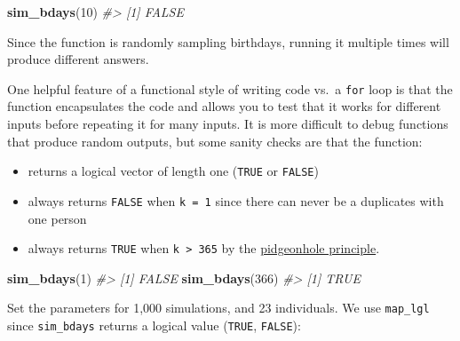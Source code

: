 \documentclass[]{book}
\newenvironment{Shaded}{\begin{snugshade}}{\end{snugshade}}
\newcommand{\CommentTok}[1]{\textcolor[rgb]{0.56,0.35,0.01}{\textit{#1}}}
\newcommand{\DecValTok}[1]{\textcolor[rgb]{0.00,0.00,0.81}{#1}}
\newcommand{\KeywordTok}[1]{\textcolor[rgb]{0.13,0.29,0.53}{\textbf{#1}}}
\newcommand{\NormalTok}[1]{#1}
\newcommand{\OperatorTok}[1]{\textcolor[rgb]{0.81,0.36,0.00}{\textbf{#1}}}
\newcommand{\StringTok}[1]{\textcolor[rgb]{0.31,0.60,0.02}{#1}}
\providecommand{\tightlist}{%
  \setlength{\itemsep}{0pt}\setlength{\parskip}{0pt}}
\theoremstyle{definition}
\theoremstyle{definition}
\theoremstyle{definition}
\theoremstyle{remark}
\begin{document}
\begin{Shaded}
\begin{Highlighting}[]
\KeywordTok{sim_bdays}\NormalTok{(}\DecValTok{10}\NormalTok{)}
\CommentTok{#> [1] FALSE}
\end{Highlighting}
\end{Shaded}

Since the function is randomly sampling birthdays, running it multiple
times will produce different answers.

One helpful feature of a functional style of writing code vs.~a
\texttt{for} loop is that the function encapsulates the code and allows
you to test that it works for different inputs before repeating it for
many inputs. It is more difficult to debug functions that produce random
outputs, but some sanity checks are that the function:

\begin{itemize}
\tightlist
\item
  returns a logical vector of length one (\texttt{TRUE} or
  \texttt{FALSE})
\item
  always returns \texttt{FALSE} when \texttt{k\ =\ 1} since there can
  never be a duplicates with one person
\item
  always returns \texttt{TRUE} when \texttt{k\ \textgreater{}\ 365} by
  the
  \href{https://en.wikipedia.org/wiki/Pigeonhole_principle}{pidgeonhole
  principle}.
\end{itemize}

\begin{Shaded}
\begin{Highlighting}[]
\KeywordTok{sim_bdays}\NormalTok{(}\DecValTok{1}\NormalTok{)}
\CommentTok{#> [1] FALSE}
\KeywordTok{sim_bdays}\NormalTok{(}\DecValTok{366}\NormalTok{)}
\CommentTok{#> [1] TRUE}
\end{Highlighting}
\end{Shaded}

Set the parameters for 1,000 simulations, and 23 individuals. We use
\texttt{map\_lgl} since \texttt{sim\_bdays} returns a logical value
(\texttt{TRUE}, \texttt{FALSE}):

\begin{Shaded}
\end{Shaded}
\end{document}
